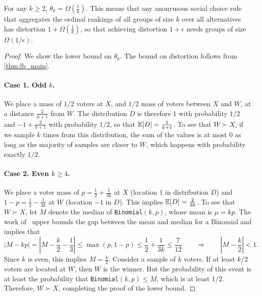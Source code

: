 \begin{theorem}
\label{thm:lb1}
For any $k \ge 2$, $\theta_k = \Omega\left(\frac{1}{k}\right)$. This means that any anonymous social choice rule that aggregates the ordinal rankings of all groups of size $k$ over all alternatives has distortion $1 + \Omega\left(\frac{1}{k}\right)$, so that achieving distortion $1+\epsilon$ needs groups of size $\Omega(1/\epsilon)$.
\end{theorem}
\begin{proof} 
We show the lower bound on $\theta_k$. The bound on distortion follows from \cref{thm:lb_main}.

\paragraph{Case 1. Odd $k$.} We place a mass of $1/2$ voters at $X$, and $1/2$ mass of voters between $X$ and $W$, at a distance $\frac{2}{k+1}$ from $W$. The distribution $D$ is therefore $1$ with probability $1/2$ and $-1+\frac{2}{k+1}$ with probability $1/2$, so that $\mathbb{E}[D] = \frac{1}{k+1}$. To see that $W \succ X$, if we sample $k$ times from this distribution, the sum of the values is at most $0$ as long as the majority of samples are closer to $W$, which happens with probability exactly $1/2$. 

\paragraph{Case 2. Even $k \ge 4$.} We place a voter mass of $p = \frac{1}{2} + \frac{1}{3k}$ at $X$ (location $1$ in distribution $D$) and $1-p = \frac{1}{2} - \frac{1}{3k}$ at $W$ (location $-1$ in  $D$). This implies $\mathbb{E}[D] =  \frac{2}{3k}$. To see that $W \succ X$, let $M$ denote the median of {\tt Binomial}$(k,p)$, whose mean is $\mu = k p$. The work of~\cite{Binomial} upper bounds the gap between the mean and median for a Binomial and implies that 
$$ | M - kp| = \left|M - \frac{k}{2} - \frac{1}{3}\right|  \le \max(p,1-p) \le \frac{1}{2} + \frac{1}{3k} \le \frac{7}{12} \qquad \Rightarrow \qquad \left|M - \frac{k}{2} \right| < 1.$$
Since $k$ is even, this implies $ M = \frac{k}{2}$. Consider a sample of $k$ voters. If at least $k/2$ voters are located at $W$, then $W$ is the winner. But the probability of this event is at least the probability that {\tt Binomial}$(k,p) \le M$, which is at least $1/2$. Therefore, $W \succ X$, completing the proof of the lower bound. 
\end{proof}



